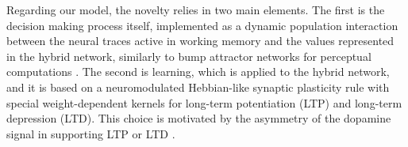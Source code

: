 Regarding our model, the novelty relies in two main elements. The first is the decision making process itself, implemented as a dynamic population interaction between the neural traces active in working memory and the values represented in the hybrid network, similarly to bump attractor networks for
perceptual computations \cite{carrollEncodingCertaintyBump2014, esnaola-acebesBumpAttractorDynamics2021}.
The second is learning, which is applied to the hybrid network, and it is based on a neuromodulated Hebbian-like synaptic plasticity rule with special weight-dependent kernels for long-term potentiation (LTP) and long-term depression (LTD).
This choice is motivated by the asymmetry of the dopamine signal in supporting LTP or LTD \cite{schultzNeuralSubstratePrediction1997, toblerAdaptiveCodingReward2005, reynoldsDopaminedependentPlasticityCorticostriatal2002, madadiaslDopaminergicModulationSynaptic2019}.


